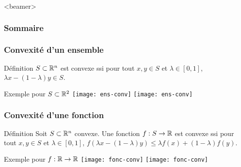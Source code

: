 \documentclass{beamer}
\newcommand{\R}{{\ensuremath\mathbb{R}}}
\begin{document}
\begin{frame}<beamer>
  \frametitle{Sommaire}
  \tableofcontents[currentsection]
\end{frame}


\begin{frame}
  \frametitle{Convexité d'un ensemble}

  \begin{block}{Définition}
    $S \subset \R^n$ est convexe ssi  
    pour tout $x,y \in S$ et $\lambda \in [0,1]$,
    $\lambda x - (1 - \lambda) y \in S$. 
  \end{block}

  \begin{exampleblock}{Exemple pour $S \subset \R^2$}
    \centering
    \texttt{[image: ens-conv]} \hspace{0.05\textwidth}
    \texttt{[image: ens-conv]}
  \end{exampleblock}
  
\end{frame}

\begin{frame}
  \frametitle{Convexité d'une fonction}

  \begin{block}{Définition}
     Soit $S \subset \R^n$ convexe.
     Une fonction $f : S \rightarrow \R$ est convexe ssi  
    pour tout $x,y \in S$ et $\lambda \in [0,1]$,
    $f(\lambda x - (1 - \lambda) y) \leq \lambda f(x) + (1 - \lambda) f(y)$. 
  \end{block}

  \begin{exampleblock}{Exemple pour $f:\R \rightarrow \R$}
    \centering
    \texttt{[image: fonc-conv]} \hspace{0.05\textwidth}
    \texttt{[image: fonc-conv]}
  \end{exampleblock}
  
\end{frame}
\end{document}
